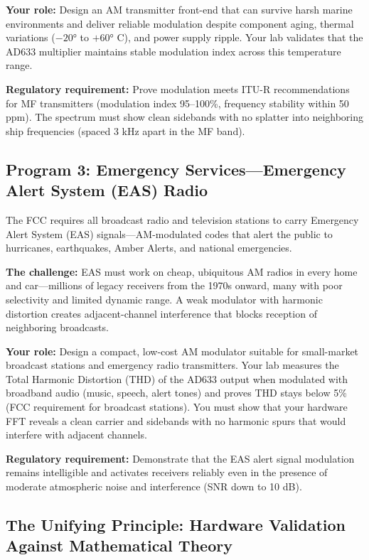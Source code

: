 \documentclass[11pt,letterpaper]{article}
\begin{document}
\textbf{Your role:} Design an AM transmitter front-end that can survive harsh marine environments and deliver reliable modulation despite component aging, thermal variations ($-20°$ to $+60°$ C), and power supply ripple. Your lab validates that the AD633 multiplier maintains stable modulation index across this temperature range.

\textbf{Regulatory requirement:} Prove modulation meets ITU-R recommendations for MF transmitters (modulation index 95--100\%, frequency stability within 50 ppm). The spectrum must show clean sidebands with no splatter into neighboring ship frequencies (spaced 3 kHz apart in the MF band).

\subsection{Program 3: Emergency Services—Emergency Alert System (EAS) Radio}

The FCC requires all broadcast radio and television stations to carry Emergency Alert System (EAS) signals—AM-modulated codes that alert the public to hurricanes, earthquakes, Amber Alerts, and national emergencies.

\textbf{The challenge:} EAS must work on cheap, ubiquitous AM radios in every home and car—millions of legacy receivers from the 1970s onward, many with poor selectivity and limited dynamic range. A weak modulator with harmonic distortion creates adjacent-channel interference that blocks reception of neighboring broadcasts.

\textbf{Your role:} Design a compact, low-cost AM modulator suitable for small-market broadcast stations and emergency radio transmitters. Your lab measures the Total Harmonic Distortion (THD) of the AD633 output when modulated with broadband audio (music, speech, alert tones) and proves THD stays below 5\% (FCC requirement for broadcast stations). You must show that your hardware FFT reveals a clean carrier and sidebands with no harmonic spurs that would interfere with adjacent channels.

\textbf{Regulatory requirement:} Demonstrate that the EAS alert signal modulation remains intelligible and activates receivers reliably even in the presence of moderate atmospheric noise and interference (SNR down to 10 dB).

\subsection{The Unifying Principle: Hardware Validation Against Mathematical Theory}
\end{document}
